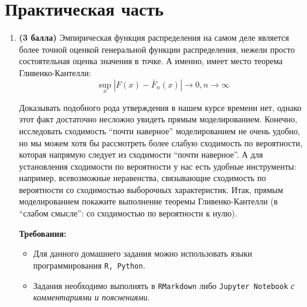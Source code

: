 \documentclass{assignment}
\begin{document}
\newpage

\section*{Практическая часть}
\begin{enumerate}
    \item \textbf{(3 балла)} Эмпирическая функция распределения на самом деле является более точной оценкой генеральной функции распределения, нежели просто состоятельная оценка значения в точке. А именно, имеет место теорема Гливенко-Кантелли:
    $$\sup_x |F(x) - \bar{F}_n(x)| \to 0, n \to \infty$$

    Доказывать подобного рода утверждения в нашем курсе времени нет, однако этот факт достаточно несложно увидеть прямым моделированием. Конечно, исследовать сходимость “почти наверное” моделированием не очень удобно, но мы можем хотя бы рассмотреть более слабую сходимость по вероятности, которая напрямую следует из сходимости “почти наверное”. А для установления сходимости по вероятности у нас есть удобные инструменты: например, всевозможные неравенства, связывающие сходимость по вероятности со сходимостью выборочных характеристик.
    Итак, прямым моделированием покажите выполнение теоремы Гливенко-Кантелли (в “слабом смысле”: со сходимостью по вероятности к нулю). 

    \textbf{Требования:}
    \begin{itemize}
         \item Для данного домашнего задания можно использовать языки программирования \texttt{R, Python}.
         \item Задания необходимо выполнять в \texttt{RMarkdown} либо \texttt{Jupyter Notebook} \textit{с комментариями и пояснениями}.
    \end{itemize}

\end{enumerate}
\end{document}
